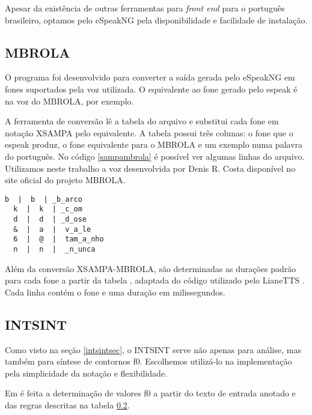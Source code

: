 Apesar da existência de outras ferramentas para \emph{front end} para o
português brasileiro, optamos pelo eSpeakNG pela disponibilidade e facilidade de
instalação.


\subsection{MBROLA}
O programa  foi desenvolvido para converter a saída gerada
pelo eSpeakNG em fones suportados pela voz utilizada. O equivalente ao
fone \code{/&/} gerado pelo espeak é  na voz do MBROLA, por exemplo.

A ferramenta de conversão lê a tabela do arquivo  e
substitui cada fone em notação XSAMPA pelo equivalente. A tabela possui três
colunas: o fone que o espeak produz, o fone equivalente para o MBROLA e um
exemplo numa palavra do português. No código \ref{sampambrola} é possível ver
algumas linhas do arquivo. Utilizamos neste trabalho a voz 
desenvolvida por Denis R. Costa disponível no site oficial do projeto MBROLA.

\begin{lstlisting}[caption=Extrato de linhas da tabela de conversão, label=sampambrola]
  b  |  b  | _b_arco
  k  |  k  | _c_om
  d  |  d  | _d_ose
  &  |  a  |  v_a_le
  6  |  @  |  tam_a_nho
  n  |  n  |  _n_unca
\end{lstlisting}

Além da conversão XSAMPA-MBROLA, são determinadas as durações padrão para cada
fone a partir da tabela , adaptada do código utilizado pelo
LianeTTS \cite{lianetts}. Cada linha contém o fone e uma duração em milissegundos.

\subsection{INTSINT}
\label{intsintrules}
Como visto na seção \ref{intsintsec}, o INTSINT serve não apenas para análise,
mas também para síntese de contornos f0. Escolhemos utilizá-lo na implementação
pela simplicidade da notação e flexibilidade.

Em  é feita a determinação de valores f0 a partir do texto de
entrada anotado e das regras descritas na tabela \ref{intsintrules}.

